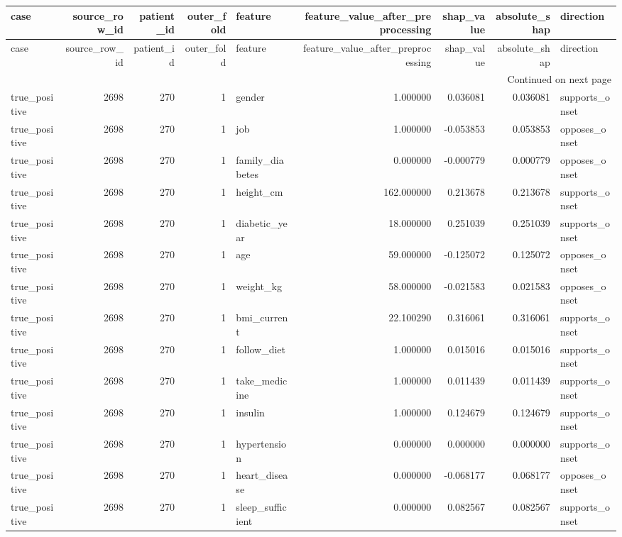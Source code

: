 \begin{longtable}{lrrrlrrrl}
\toprule
case & source\_row\_id & patient\_id & outer\_fold & feature & feature\_value\_after\_preprocessing & shap\_value & absolute\_shap & direction \\
\midrule
\endfirsthead
\toprule
case & source\_row\_id & patient\_id & outer\_fold & feature & feature\_value\_after\_preprocessing & shap\_value & absolute\_shap & direction \\
\midrule
\endhead
\midrule
\multicolumn{9}{r}{Continued on next page} \\
\midrule
\endfoot
\bottomrule
\endlastfoot
true\_positive & 2698 & 270 & 1 & gender & 1.000000 & 0.036081 & 0.036081 & supports\_onset \\
true\_positive & 2698 & 270 & 1 & job & 1.000000 & -0.053853 & 0.053853 & opposes\_onset \\
true\_positive & 2698 & 270 & 1 & family\_diabetes & 0.000000 & -0.000779 & 0.000779 & opposes\_onset \\
true\_positive & 2698 & 270 & 1 & height\_cm & 162.000000 & 0.213678 & 0.213678 & supports\_onset \\
true\_positive & 2698 & 270 & 1 & diabetic\_year & 18.000000 & 0.251039 & 0.251039 & supports\_onset \\
true\_positive & 2698 & 270 & 1 & age & 59.000000 & -0.125072 & 0.125072 & opposes\_onset \\
true\_positive & 2698 & 270 & 1 & weight\_kg & 58.000000 & -0.021583 & 0.021583 & opposes\_onset \\
true\_positive & 2698 & 270 & 1 & bmi\_current & 22.100290 & 0.316061 & 0.316061 & supports\_onset \\
true\_positive & 2698 & 270 & 1 & follow\_diet & 1.000000 & 0.015016 & 0.015016 & supports\_onset \\
true\_positive & 2698 & 270 & 1 & take\_medicine & 1.000000 & 0.011439 & 0.011439 & supports\_onset \\
true\_positive & 2698 & 270 & 1 & insulin & 1.000000 & 0.124679 & 0.124679 & supports\_onset \\
true\_positive & 2698 & 270 & 1 & hypertension & 0.000000 & 0.000000 & 0.000000 & supports\_onset \\
true\_positive & 2698 & 270 & 1 & heart\_disease & 0.000000 & -0.068177 & 0.068177 & opposes\_onset \\
true\_positive & 2698 & 270 & 1 & sleep\_sufficient & 0.000000 & 0.082567 & 0.082567 & supports\_onset \\

\end{longtable}
